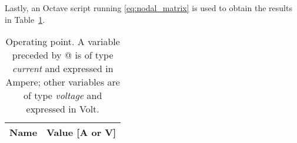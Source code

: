 Lastly, an Octave script running \ref{eq:nodal_matrix} is used to obtain the results in Table~\ref{tab:op3}.


\begin{table}[h]
  \centering
  \begin{tabular}{|l|r|}
    \hline    
    {\bf Name} & {\bf Value [A or V]} \\ \hline
    
  \end{tabular}
  \caption{Operating point. A variable preceded by @ is of type {\em current}
    and expressed in Ampere; other variables are of type {\it voltage} and expressed in
    Volt.}
  \label{tab:op3}
\end{table}





